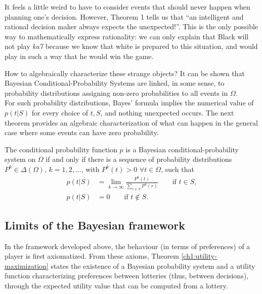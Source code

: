 It feels a little weird to have to consider events that should never happen when planning one's decision. However, Theorem 1 tells us that ``an intelligent and rational decision maker always expects the unexpected!''.
This is the only possible way to mathematically express rationality: we can only explain that Black will not play \emph{ka7} because we know that white is prepared to this situation, and would play in such a way that he would win the game.

How to algebraically characterize these strange objects? It can be shown that Bayesian Conditional-Probability Systems are linked, in some sense, to probability distributions assigning non-zero probabilities to all events in $\Omega$. \\
For such probability distributions, Bayes' formula implies the numerical value of $p(t|S)$ for every choice of $t,S$, and nothing unexpected occurs.  The next theorem provides an algebraic characterization of what can happen in the general case where some events can have zero probability.

\begin{theorem}
The conditional probability function $p$ is a Bayesian conditional-probability system on $\Omega$ if and only if there is a sequence of probability distributions $P^k \in \Delta(\Omega)$, $k = 1, 2, \ldots$, with $P^k(t) > 0$ $\forall t \in \Omega$, such that
\begin{equation}
\begin{aligned}
p(t|S) & = \lim_{k \rightarrow \infty} \frac{P^k(t)}{\sum_{r \in S} P^k(r)} \qquad \text{if $t \in S$},\\
p(t|S) & = 0  \qquad \text{if $t \not \in S$}.
\end{aligned}
\end{equation} 
\end{theorem}

\subsection{Limits of the Bayesian framework}

In the framework developed above, the behaviour (in terms of preferences) of a player is first axiomatized. From these axioms, Theorem \ref{ch1:utility-maximization} states the existence of a Bayesian probability system and a utility function characterizing preferences between lotteries (thus, between decisions), through the expected utility value that can be computed from a lottery.

